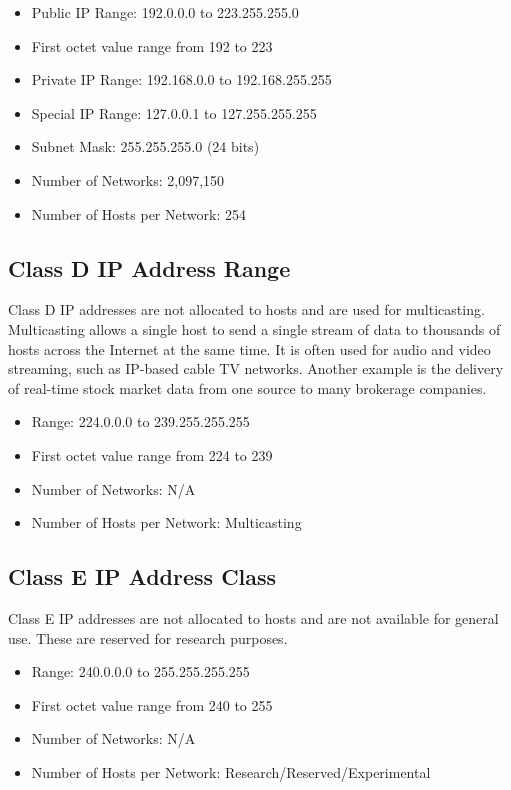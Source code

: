 \documentclass[a4paper,12pt]{article}
\begin{document}
\begin{itemize}
\item{Public IP Range: 192.0.0.0 to 223.255.255.0}
\item{First octet value range from 192 to 223}
\item{Private IP Range: 192.168.0.0 to 192.168.255.255}
\item{Special IP Range: 127.0.0.1 to 127.255.255.255}
\item{Subnet Mask: 255.255.255.0 (24 bits)}
\item{Number of Networks: 2,097,150}
\item{Number of Hosts per Network: 254}
\end{itemize}
\clearpage
\subsection{Class D IP Address Range}
Class D IP addresses are not allocated to hosts and are used for multicasting. Multicasting allows a single host to send a single stream of data to thousands of hosts across the Internet at the same time. It is often used for audio and video streaming, such as IP-based cable TV networks. Another example is the delivery of real-time stock market data from one source to many brokerage companies.

\begin{itemize}
\item{Range: 224.0.0.0 to 239.255.255.255}
\item{First octet value range from 224 to 239}
\item{Number of Networks: N/A}
\item{Number of Hosts per Network: Multicasting}
\end{itemize}


\subsection{Class E IP Address Class}
Class E IP addresses are not allocated to hosts and are not available for general use. These are reserved for research purposes.

\begin{itemize}
\item{Range: 240.0.0.0 to 255.255.255.255}
\item{First octet value range from 240 to 255}
\item{Number of Networks: N/A}
\item{Number of Hosts per Network: Research/Reserved/Experimental}
\end{itemize}

\clearpage
\printindex
\end{document}
